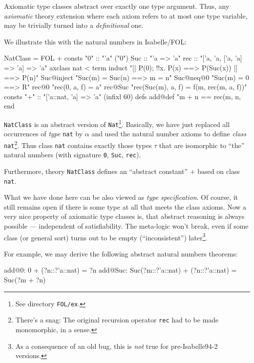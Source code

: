 \begin{ascbox}
\begin{ascbox}
\begin{ascbox}
\begin{ascbox}
\begin{ascbox}
\begin{ascbox}
\begin{ascbox}
\begin{ascbox}
\begin{ascbox}
\begin{ascbox}
\begin{ascbox}
Axiomatic type classes abstract over exactly one type argument. Thus,
any \emph{axiomatic} theory extension where each axiom refers to at most
one type variable, may be trivially turned into a \emph{definitional}
one.

We illustrate this with the natural numbers in Isabelle/FOL:

\begin{ascbox}
NatClass = FOL +\medskip
consts
  "0"           :: "'a"                                 ("0")
  Suc           :: "'a => 'a"
  rec           :: "['a, 'a, ['a, 'a] => 'a] => 'a"\medskip
axclass
  nat < term
  induct        "[| P(0); !!x. P(x) ==> P(Suc(x)) |] ==> P(n)"
  Suc@inject    "Suc(m) = Suc(n) ==> m = n"
  Suc@neq@0     "Suc(m) = 0 ==> R"
  rec@0         "rec(0, a, f) = a"
  rec@Suc       "rec(Suc(m), a, f) = f(m, rec(m, a, f))"\medskip
consts
  "+"           :: "['a::nat, 'a] => 'a"                (infixl 60)\medskip
defs
  add@def       "m + n == rec(m, n, %
end

\texttt{NatClass} is an abstract version of \texttt{Nat}\footnote{See
  directory \texttt{FOL/ex}.}. Basically, we have just replaced all
occurrences of \emph{type} \texttt{nat} by $\alpha$ and used the natural
number axioms to define \emph{class} \texttt{nat}\footnote{There's a snag:
  The original recursion operator \texttt{rec} had to be made monomorphic,
  in a sense.}. Thus class \texttt{nat} contains exactly those types
$\tau$ that are isomorphic to ``the'' natural numbers (with signature
\texttt{0}, \texttt{Suc}, \texttt{rec}).

Furthermore, theory \texttt{NatClass} defines an ``abstract constant'' $+$
based on class \texttt{nat}.

\medskip

What we have done here can be also viewed as \emph{type specification}.
Of course, it still remains open if there is some type at all that
meets the class axioms. Now a very nice property of axiomatic type
classes is, that abstract reasoning is always possible --- independent
of satisfiability. The meta-logic won't break, even if some class (or
general sort) turns out to be empty (``inconsistent'')
later\footnote{As a consequence of an old bug, this is \emph{not} true
  for pre-Isabelle94-2 versions.}.

For example, we may derive the following abstract natural numbers
theorems:

\begin{ascbox}
add@0:    0 + (?n::?'a::nat) = ?n
add@Suc:  Suc(?m::?'a::nat) + (?n::?'a::nat) = Suc(?m + ?n)


\end{ascbox}
\end{ascbox}
\end{ascbox}
\end{ascbox}
\end{ascbox}
\end{ascbox}
\end{ascbox}
\end{ascbox}
\end{ascbox}
\end{ascbox}
\end{ascbox}
\end{ascbox}
\end{ascbox}

